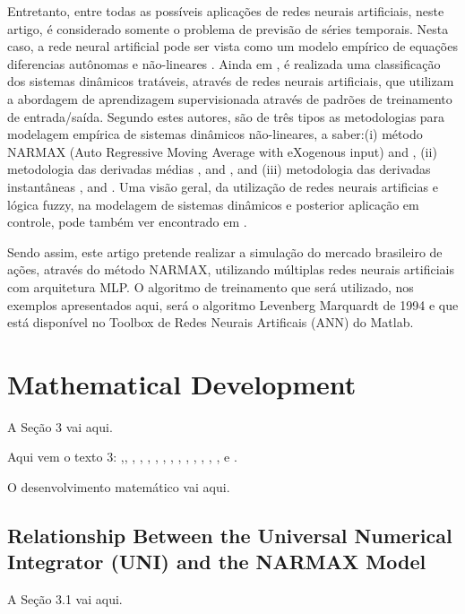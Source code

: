 \documentclass[journal,article,submit,pdftex,moreauthors]{Definitions/mdpi}
\begin{document}
Entretanto, entre todas as possíveis aplicações de redes neurais artificiais, neste artigo, é considerado somente o problema de previsão de séries temporais. Nesta caso, a rede neural artificial pode ser vista como um modelo empírico de equações diferencias autônomas e não-lineares \cite{ref4}. Ainda em \cite{ref4}, é realizada uma classificação dos sistemas dinâmicos tratáveis, através de redes neurais artificiais, que utilizam a abordagem de aprendizagem supervisionada através de padrões de treinamento de entrada/saída. Segundo estes autores, são de três tipos as metodologias para modelagem empírica de sistemas dinâmicos não-lineares, a saber:(i) método NARMAX (Auto Regressive Moving Average with eXogenous input) \cite{ref5} and \cite{ref6}, (ii) metodologia das derivadas médias \cite{ref7, ref8}, and \cite{ref9}, and (iii) metodologia das derivadas instantâneas \cite{ref10, ref11, ref12, ref13}, and \cite{ref14}. Uma visão geral, da utilização de redes neurais artificias e lógica fuzzy, na modelagem de sistemas dinâmicos e posterior aplicação em controle, pode também ver encontrado em \cite{ref15}.

Sendo assim, este artigo pretende realizar a simulação do mercado brasileiro de ações, através do método NARMAX, utilizando múltiplas redes neurais artificiais com arquitetura MLP. O algoritmo de treinamento que será utilizado, nos exemplos apresentados aqui, será o algoritmo Levenberg Marquardt \cite{ref16} de 1994 e que está disponível no Toolbox de Redes Neurais Artificais (ANN) do Matlab.
         

\section{Mathematical Development}

A Seção 3 vai aqui.

Aqui vem o texto 3: \cite{ref1},\cite{ref2}, \cite{ref3}, \cite{ref4}, \cite{ref5}, \cite{ref6}, \cite{ref7}, \cite{ref8}, \cite{ref9}, \cite{ref10}, \cite{ref11}, \cite{ref12}, \cite{ref13}, \cite{ref14}, \cite{ref15} e \cite{ref16}.

O desenvolvimento matemático vai aqui.

\subsection{Relationship Between the Universal Numerical Integrator (UNI) and the NARMAX Model}

A Seção 3.1 vai aqui.
\end{document}
